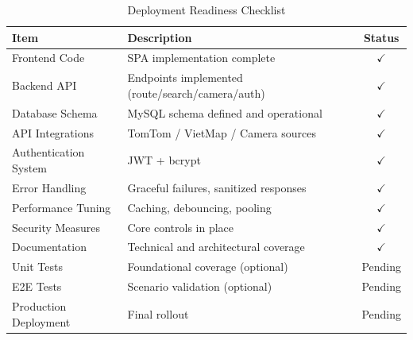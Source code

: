 \begin{table}[H]
\centering
\begin{tabular}{|l|l|c|}
\hline
\textbf{Item} & \textbf{Description} & \textbf{Status} \\
\hline
Frontend Code & SPA implementation complete & $\checkmark$ \\
Backend API & Endpoints implemented (route/search/camera/auth) & $\checkmark$ \\
Database Schema & MySQL schema defined and operational & $\checkmark$ \\
API Integrations & TomTom / VietMap / Camera sources & $\checkmark$ \\
Authentication System & JWT + bcrypt & $\checkmark$ \\
Error Handling & Graceful failures, sanitized responses & $\checkmark$ \\
Performance Tuning & Caching, debouncing, pooling & $\checkmark$ \\
Security Measures & Core controls in place & $\checkmark$ \\
Documentation & Technical and architectural coverage & $\checkmark$ \\
Unit Tests & Foundational coverage (optional) & Pending \\
E2E Tests & Scenario validation (optional) & Pending \\
Production Deployment & Final rollout & Pending \\
\hline
\end{tabular}
\caption{Deployment Readiness Checklist}
\end{table}



